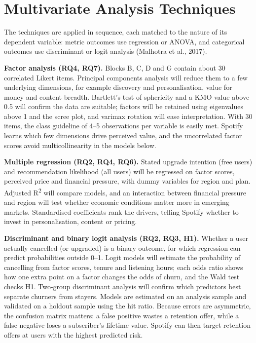 \documentclass[11pt,a4paper]{article}
\begin{document}
\section{Multivariate Analysis Techniques}
The techniques are applied in sequence, each matched to the nature of its dependent variable: metric outcomes use regression or ANOVA, and categorical outcomes use discriminant or logit analysis (Malhotra et al., 2017).

\textbf{Factor analysis (RQ4, RQ7).} Blocks B, C, D and G contain about 30 correlated Likert items. Principal components analysis will reduce them to a few underlying dimensions, for example discovery and personalisation, value for money and content breadth. Bartlett's test of sphericity and a KMO value above 0.5 will confirm the data are suitable; factors will be retained using eigenvalues above 1 and the scree plot, and varimax rotation will ease interpretation. With 30 items, the class guideline of 4–5 observations per variable is easily met. Spotify learns which few dimensions drive perceived value, and the uncorrelated factor scores avoid multicollinearity in the models below.

\textbf{Multiple regression (RQ2, RQ4, RQ6).} Stated upgrade intention (free users) and recommendation likelihood (all users) will be regressed on factor scores, perceived price and financial pressure, with dummy variables for region and plan. Adjusted R\textsuperscript{2} will compare models, and an interaction between financial pressure and region will test whether economic conditions matter more in emerging markets. Standardised coefficients rank the drivers, telling Spotify whether to invest in personalisation, content or pricing.

\textbf{Discriminant and binary logit analysis (RQ2, RQ3, H1).} Whether a user actually cancelled (or upgraded) is a binary outcome, for which regression can predict probabilities outside 0–1. Logit models will estimate the probability of cancelling from factor scores, tenure and listening hours; each odds ratio shows how one extra point on a factor changes the odds of churn, and the Wald test checks H1. Two-group discriminant analysis will confirm which predictors best separate churners from stayers. Models are estimated on an analysis sample and validated on a holdout sample using the hit ratio. Because errors are asymmetric, the confusion matrix matters: a false positive wastes a retention offer, while a false negative loses a subscriber's lifetime value. Spotify can then target retention offers at users with the highest predicted risk.
\end{document}
